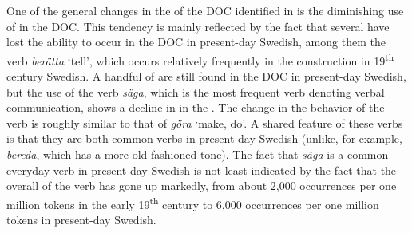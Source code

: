 \documentclass[output=paper]{langscibook}
\begin{document}
\label{sec:valdeson:5.3.1.4}\largerpage[-1]
One of the general changes in the  of the DOC identified in \textcite{ValdesonSubmitted} is the diminishing use of  in the DOC. This tendency is mainly reflected by the fact that several  have lost the ability to occur in the DOC in present-day Swedish, among them the verb \textit{berätta} ‘tell’, which occurs relatively frequently in the construction in 19\textsuperscript{th} century Swedish. A handful of  are still found in the DOC in present-day Swedish, but the use of the verb \textit{säga}, which is the most frequent verb denoting verbal communication, shows a decline in  in the . The change in the behavior of the verb is roughly similar to that of \textit{göra} ‘make, do’. A shared feature of these verbs is that they are both common verbs in present-day Swedish (unlike, for example, \textit{bereda}, which has a more old-fashioned tone). The fact that \textit{säga} is a common everyday verb in present-day Swedish is not least indicated by the fact that the overall  of the verb has gone up markedly, from about 2,000 occurrences per one million tokens in the early 19\textsuperscript{th} century to 6,000 occurrences per one million tokens in present-day Swedish.


\begin{table}
\caption{Frequency measures of the verb-specific DOC with \textit{säga} ‘say, tell’}
\label{tab:valdeson:11}
\end{table}
\end{document}

